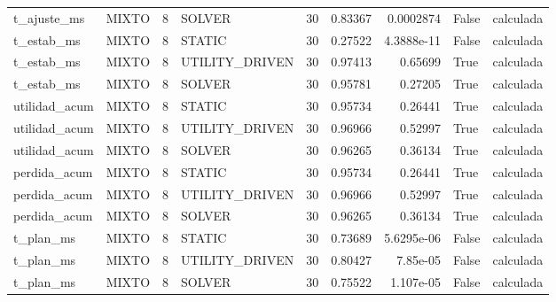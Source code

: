 \begin{tabular}{llrlrrrll}
t_ajuste_ms & MIXTO & 8 & SOLVER & 30 & 0.83367 & 0.0002874 & False & calculada \\
t_estab_ms & MIXTO & 8 & STATIC & 30 & 0.27522 & 4.3888e-11 & False & calculada \\
t_estab_ms & MIXTO & 8 & UTILITY_DRIVEN & 30 & 0.97413 & 0.65699 & True & calculada \\
t_estab_ms & MIXTO & 8 & SOLVER & 30 & 0.95781 & 0.27205 & True & calculada \\
utilidad_acum & MIXTO & 8 & STATIC & 30 & 0.95734 & 0.26441 & True & calculada \\
utilidad_acum & MIXTO & 8 & UTILITY_DRIVEN & 30 & 0.96966 & 0.52997 & True & calculada \\
utilidad_acum & MIXTO & 8 & SOLVER & 30 & 0.96265 & 0.36134 & True & calculada \\
perdida_acum & MIXTO & 8 & STATIC & 30 & 0.95734 & 0.26441 & True & calculada \\
perdida_acum & MIXTO & 8 & UTILITY_DRIVEN & 30 & 0.96966 & 0.52997 & True & calculada \\
perdida_acum & MIXTO & 8 & SOLVER & 30 & 0.96265 & 0.36134 & True & calculada \\
t_plan_ms & MIXTO & 8 & STATIC & 30 & 0.73689 & 5.6295e-06 & False & calculada \\
t_plan_ms & MIXTO & 8 & UTILITY_DRIVEN & 30 & 0.80427 & 7.85e-05 & False & calculada \\
t_plan_ms & MIXTO & 8 & SOLVER & 30 & 0.75522 & 1.107e-05 & False & calculada \\
\bottomrule
\end{tabular}
